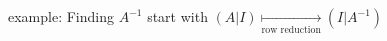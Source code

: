 


example: Finding $A^{-1}$
start with $(A | I) \underset{\text{row reduction}}{\longmapsto}  (I | A^{-1})$ 



